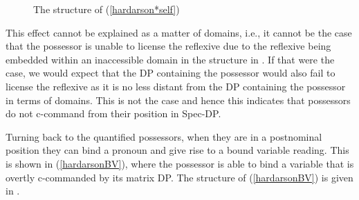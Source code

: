 \documentclass[output=paper,colorlinks,citecolor=brown,
]{langscibook}
\begin{document}
\begin{exe}
	\ex	\label{hardarsonunbound} 
		\begin{xlist}
			\label{hardarson*self}
		\end{xlist}
\end{exe}

\begin{figure}
\caption{The structure of (\ref{hardarson*self})\label{hardarson*selfstr}}
\end{figure}

This effect cannot be explained as a matter of domains, i.e., it cannot be the case that the possessor is unable to license the reflexive due to the reflexive being embedded within an inaccessible domain in the structure in . If that were the case, we would expect that the DP containing the possessor would also fail to license the reflexive as it is no less distant from the DP containing the possessor in terms of domains. This is not the case and hence this indicates that possessors do not c-command from their position in Spec-DP.

Turning back to the quantified possessors, when they are in a postnominal position they can bind a pronoun and give rise to a bound variable reading. This is shown in (\ref{hardarsonBV}), where the possessor is able to bind a variable that is overtly c-commanded by its matrix DP. The structure of (\ref{hardarsonBV}) is given in .
\end{document}
